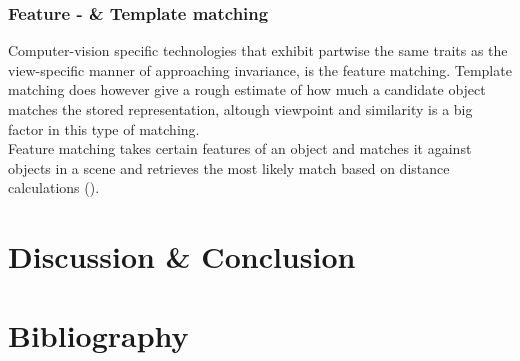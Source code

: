 \documentclass{article}
\newcommand{\goodcite}[1]{ {(\cite{#1})}}
\begin{document}
\subsubsection{Feature - \& Template matching}
Computer-vision specific technologies that exhibit partwise the same traits as the view-specific manner of approaching invariance, is the feature matching. Template matching does however give a rough estimate of how much a candidate object matches the stored representation, altough viewpoint and similarity is a big factor in this type of matching.\\Feature matching takes certain features of an object and matches it against objects in a scene and retrieves the most likely match based on distance calculations\goodcite{OpenCV}.



\section{Discussion \& Conclusion}
\newpage
\section{Bibliography}
\label{sec:Bibliography}
\printbibliography
\end{document}
